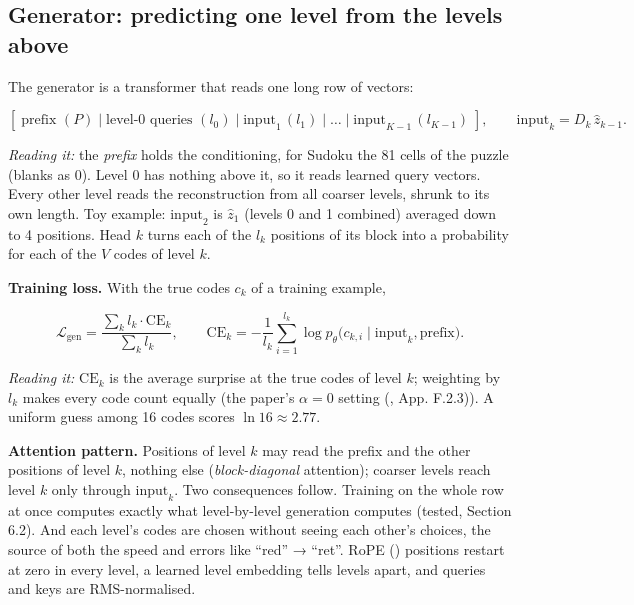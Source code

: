 \documentclass[
  british,
]{article}
\begin{document}
\subsection{Generator: predicting one level from the levels
above}\label{generator-predicting-one-level-from-the-levels-above}

The generator is a transformer that reads one long row of vectors:

\[[\;\text{prefix } (P)\;|\;\text{level-0 queries } (l_0)\;|\;\text{input}_1\, (l_1)\;|\;\dots\;|\;\text{input}_{K-1}\,(l_{K-1})\;],
\qquad \text{input}_k = D_k\, \hat z_{k-1} .\]

\emph{Reading it:} the \emph{prefix} holds the conditioning, for Sudoku
the 81 cells of the puzzle (blanks as 0). Level 0 has nothing above it,
so it reads learned query vectors. Every other level reads the
reconstruction from all coarser levels, shrunk to its own length. Toy
example: \(\mathrm{input}_2\) is \(\hat z_1\) (levels 0 and 1 combined)
averaged down to 4 positions. Head \(k\) turns each of the \(l_k\)
positions of its block into a probability for each of the \(V\) codes of
level \(k\).

\textbf{Training loss.} With the true codes \(c_k\) of a training
example,

\[\mathcal{L}_{\mathrm{gen}} = \frac{\sum_k l_k \cdot \mathrm{CE}_k}{\sum_k l_k}, \qquad \mathrm{CE}_k = -\frac{1}{l_k}\sum_{i=1}^{l_k} \log p_\theta\big(c_{k,i} \mid \text{input}_k, \text{prefix}\big).\]

\emph{Reading it:} \(\mathrm{CE}_k\) is the average surprise at the true
codes of level \(k\); weighting by \(l_k\) makes every code count
equally (the paper's \(\alpha = 0\) setting
(, App. F.2.3)). A uniform
guess among 16 codes scores \(\ln 16 \approx 2.77\).

\textbf{Attention pattern.} Positions of level \(k\) may read the prefix
and the other positions of level \(k\), nothing else
(\emph{block-diagonal} attention); coarser levels reach level \(k\) only
through \(\mathrm{input}_k\). Two consequences follow. Training on the
whole row at once computes exactly what level-by-level generation
computes (tested, Section 6.2). And each level's codes are chosen
without seeing each other's choices, the source of both the speed and
errors like ``red'' → ``ret''. RoPE () positions restart at zero in every level, a learned level
embedding tells levels apart, and queries and keys are RMS-normalised.
\end{document}
